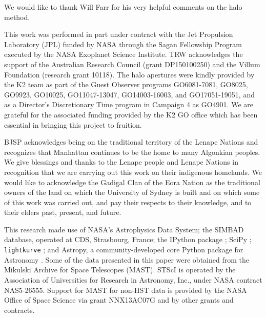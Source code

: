 \documentclass[twocolumn]{aastex62}
\begin{document}
We would like to thank Will Farr for his very helpful comments on the halo method.

This work was performed in part under contract with the Jet Propulsion Laboratory (JPL) funded by NASA through the Sagan Fellowship Program executed by the NASA Exoplanet Science Institute. TRW acknowledges the support of the Australian Research Council (grant DP150100250) and the Villum Foundation (research grant 10118). The halo apertures were kindly provided by the K2 team as part of the Guest Observer programs GO6081-7081, GO8025, GO9923, GO10025, GO11047-13047, GO14003-16003, and GO17051-19051, and as a Director's Discretionary Time program in Campaign 4 as GO4901. We are grateful for the associated funding provided by the K2 GO office which has been essential in bringing this project to fruition.

BJSP acknowledges being on the traditional territory of the Lenape Nations and recognizes that Manhattan continues to be the home to many Algonkian peoples. We give blessings and thanks to the Lenape people and Lenape Nations in recognition that we are carrying out this work on their indigenous homelands. We would like to acknowledge the Gadigal Clan of the Eora Nation as the traditional owners of the land on which the University of Sydney is built and on which some of this work was carried out, and pay their respects to their knowledge, and to their elders past, present, and future.
%

This research made use of NASA's Astrophysics Data System; the SIMBAD database, operated at CDS, Strasbourg, France; the IPython package \citep{PER-GRA:2007}; SciPy \citep{scipy}; \texttt{lightkurve} \citep{lightkurve}; and Astropy, a community-developed core Python package for Astronomy \citep{astropy}. Some of the data presented in this paper were obtained from the Mikulski Archive for Space Telescopes (MAST). STScI is operated by the Association of Universities for Research in Astronomy, Inc., under NASA contract NAS5-26555. Support for MAST for non-HST data is provided by the NASA Office of Space Science via grant NNX13AC07G and by other grants and contracts. 






\newpage









\end{document}
